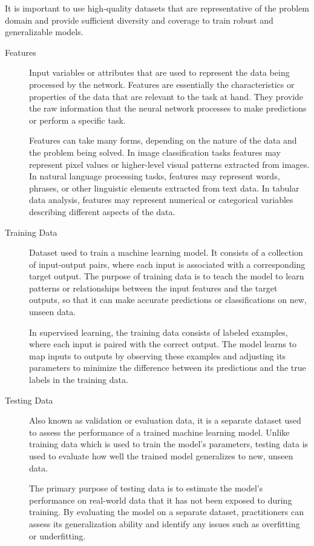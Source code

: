 \documentclass[a4paper]{article}
\begin{document}
It is important to use high-quality datasets that are representative of the problem domain and provide sufficient diversity and coverage to train robust and generalizable models.

\begin{description}
\item[Features]
Input variables or attributes that are used to represent the data being processed by the network. Features are essentially the characteristics or properties of the data that are relevant to the task at hand. They provide the raw information that the neural network processes to make predictions or perform a specific task.

Features can take many forms, depending on the nature of the data and the problem being solved. In image classification tasks features may represent pixel values or higher-level visual patterns extracted from images. In natural language processing tasks, features may represent words, phrases, or other linguistic elements extracted from text data. In tabular data analysis, features may represent numerical or categorical variables describing different aspects of the data.

\item[Training Data]
Dataset used to train a machine learning model. It consists of a collection of input-output pairs, where each input is associated with a corresponding target output. The purpose of training data is to teach the model to learn patterns or relationships between the input features and the target outputs, so that it can make accurate predictions or classifications on new, unseen data.

In supervised learning, the training data consists of labeled examples, where each input is paired with the correct output. The model learns to map inputs to outputs by observing these examples and adjusting its parameters to minimize the difference between its predictions and the true labels in the training data.

\item[Testing Data]
Also known as validation or evaluation data, it is a separate dataset used to assess the performance of a trained machine learning model. Unlike training data which is used to train the model's parameters, testing data is used to evaluate how well the trained model generalizes to new, unseen data. 

The primary purpose of testing data is to estimate the model's performance on real-world data that it has not been exposed to during training. By evaluating the model on a separate dataset, practitioners can assess its generalization ability and identify any issues such as overfitting or underfitting.


\end{description}
\end{document}
